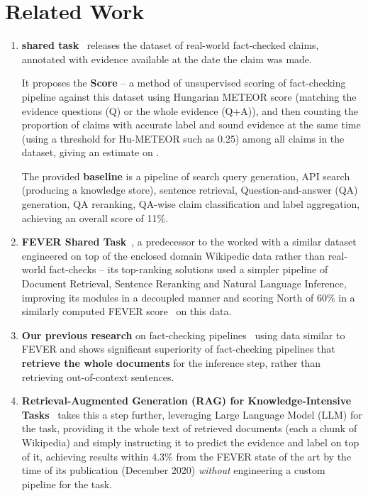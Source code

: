 \section{Related Work}
\label{sec:relwork}
\label{avscore}
\begin{enumerate}
    \item \textbf{\averitec{} shared task}~\cite{averitec2024} releases the dataset of real-world fact-checked claims, annotated with evidence available at the date the claim was made.
    
    It proposes the \textbf{\averitec{} Score} -- a method of unsupervised scoring of fact-checking pipeline against this dataset using Hungarian METEOR score (matching the evidence questions (Q) or the whole evidence (Q+A)), and then counting the proportion of claims with accurate label and sound evidence at the same time (using a threshold for Hu-METEOR such as 0.25) among all claims in the dataset, giving an estimate on .

    The provided \textbf{baseline} is a pipeline of search query generation, API search (producing a knowledge store), sentence retrieval, Question-and-answer (QA) generation, QA reranking, QA-wise claim classification and label aggregation, achieving an overall \averitec{} score of 11\%.  
    \item \textbf{FEVER Shared Task}~\cite{thorne-etal-2018-fact}, a predecessor to the \averitec{} worked with a similar dataset engineered on top of the enclosed domain Wikipedic data rather than real-world fact-checks -- its top-ranking solutions used a simpler pipeline of Document Retrieval, Sentence Reranking and Natural Language Inference, improving its modules in a decoupled manner and scoring North of 60\% in a similarly computed FEVER score~\cite{thorne-etal-2018-fever} on this data.
    \item \textbf{Our previous research} on fact-checking pipelines~\cite{Ullrich2023,drchal2023pipelinedatasetgenerationautomated} using data similar to FEVER and \averitec{} shows significant superiority of fact-checking pipelines that \textbf{retrieve the whole documents} for the inference step, rather than retrieving out-of-context sentences.
    \item \textbf{Retrieval-Augmented Generation (RAG) for Knowledge-Intensive Tasks}~\cite{rag} takes this a step further, leveraging Large Language Model (LLM) for the task, providing it the whole text of retrieved documents (each a chunk of Wikipedia) and simply instructing it to predict the evidence and label on top of it, achieving results within 4.3\% from the FEVER state of the art by the time of its publication (December 2020) \textit{without} engineering a custom pipeline for the task.
\end{enumerate}


